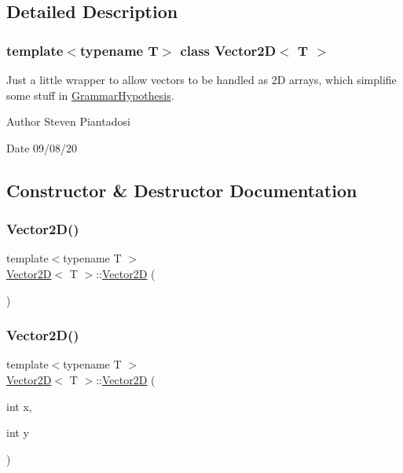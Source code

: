 \subsection{Detailed Description}
\subsubsection*{template$<$typename T$>$\newline
class Vector2\+D$<$ T $>$}

Just a little wrapper to allow vectors to be handled as 2D arrays, which simplifie some stuff in \hyperlink{class_grammar_hypothesis}{Grammar\+Hypothesis}. 

\begin{DoxyAuthor}{Author}
Steven Piantadosi 
\end{DoxyAuthor}
\begin{DoxyDate}{Date}
09/08/20 
\end{DoxyDate}


\subsection{Constructor \& Destructor Documentation}
\mbox{\label{struct_vector2_d_a96580267fed7cd6686cbbf8e11048023}} 
\subsubsection{\texorpdfstring{Vector2\+D()}{Vector2D()}\hspace{0.1cm}{\footnotesize\ttfamily [1/2]}}
{\footnotesize\ttfamily template$<$typename T $>$ \\
\hyperlink{struct_vector2_d}{Vector2D}$<$ T $>$\+::\hyperlink{struct_vector2_d}{Vector2D} (\begin{DoxyParamCaption}{ }\end{DoxyParamCaption})\hspace{0.3cm}{\ttfamily [inline]}}

\mbox{\label{struct_vector2_d_a9addb650ad17e59bfc240018508157db}} 
\subsubsection{\texorpdfstring{Vector2\+D()}{Vector2D()}\hspace{0.1cm}{\footnotesize\ttfamily [2/2]}}
{\footnotesize\ttfamily template$<$typename T $>$ \\
\hyperlink{struct_vector2_d}{Vector2D}$<$ T $>$\+::\hyperlink{struct_vector2_d}{Vector2D} (\begin{DoxyParamCaption}\item[{int}]{x,  }\item[{int}]{y }\end{DoxyParamCaption})\hspace{0.3cm}{\ttfamily [inline]}}



